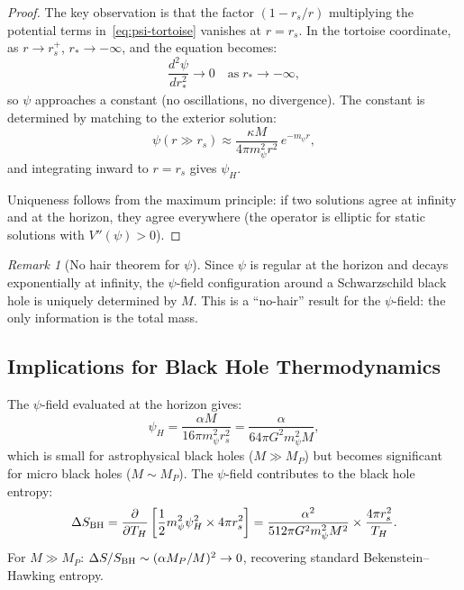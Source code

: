 \documentclass[11pt,a4paper]{article}
\theoremstyle{remark}
\newtheorem{remark}[theorem]{Remark}
\begin{document}
\begin{proof}
The key observation is that the factor $(1 - r_s/r)$ multiplying the
potential terms in~\eqref{eq:psi-tortoise} vanishes at $r = r_s$.
In the tortoise coordinate, as $r \to r_s^+$, $r_* \to -\infty$, and
the equation becomes:
\begin{equation}
\frac{d^2\psi}{dr_*^2} \to 0 \quad\text{as}\;r_* \to -\infty,
\end{equation}
so $\psi$ approaches a constant (no oscillations, no divergence).
The constant is determined by matching to the exterior solution:
\begin{equation}
\psi(r \gg r_s) \approx \frac{\kappa M}{4\pi m_\psi^2 r^2}\,e^{-m_\psi r},
\end{equation}
and integrating inward to $r = r_s$ gives $\psi_H$.

Uniqueness follows from the maximum principle: if two solutions agree
at infinity and at the horizon, they agree everywhere (the operator
is elliptic for static solutions with $V''(\psi) > 0$).
\end{proof}

\begin{remark}[No hair theorem for $\psi$]
Since $\psi$ is regular at the horizon and decays exponentially at infinity,
the $\psi$-field configuration around a Schwarzschild black hole is
uniquely determined by $M$. This is a ``no-hair'' result for the $\psi$-field:
the only information is the total mass.
\end{remark}

\subsection{Implications for Black Hole Thermodynamics}

The $\psi$-field evaluated at the horizon gives:
\begin{equation}
\psi_H = \frac{\alpha M}{16\pi m_\psi^2 r_s^2} = \frac{\alpha}{64\pi G^2 m_\psi^2 M},
\end{equation}
which is small for astrophysical black holes ($M \gg M_P$) but becomes
significant for micro black holes ($M \sim M_P$). The $\psi$-field
contributes to the black hole entropy:
\begin{equation}
\Delta S_{\rm BH} = \frac{\partial}{\partial T_H}\left[\frac{1}{2}m_\psi^2\psi_H^2 \times 4\pi r_s^2\right]
= \frac{\alpha^2}{512\pi G^2 m_\psi^2 M^2} \times \frac{4\pi r_s^2}{T_H}.
\end{equation}
For $M \gg M_P$: $\Delta S/S_{\rm BH} \sim (\alpha M_P/M)^2 \to 0$,
recovering standard Bekenstein--Hawking entropy.
\end{document}
